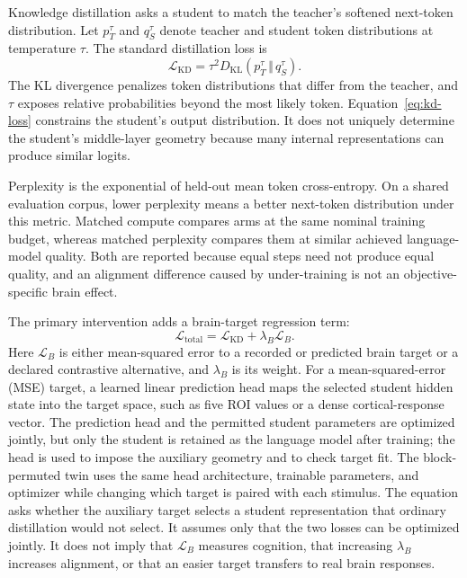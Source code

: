 Knowledge distillation asks a student to match the teacher's softened next-token distribution.
Let $p_T^{\tau}$ and $q_S^{\tau}$ denote teacher and student token distributions at temperature $\tau$.
The standard distillation loss is
\begin{equation}
  \mathcal{L}_{\mathrm{KD}}=\tau^2 D_{\mathrm{KL}}\!\left(p_T^{\tau}\,\Vert\,q_S^{\tau}\right).
  \label{eq:kd-loss}
\end{equation}
The KL divergence penalizes token distributions that differ from the teacher, and $\tau$ exposes relative probabilities beyond the most likely token.
Equation~\ref{eq:kd-loss} constrains the student's output distribution.
It does not uniquely determine the student's middle-layer geometry because many internal representations can produce similar logits.

Perplexity is the exponential of held-out mean token cross-entropy.
On a shared evaluation corpus, lower perplexity means a better next-token distribution under this metric.
Matched compute compares arms at the same nominal training budget, whereas matched perplexity compares them at similar achieved language-model quality.
Both are reported because equal steps need not produce equal quality, and an alignment difference caused by under-training is not an objective-specific brain effect.

The primary intervention adds a brain-target regression term:
\begin{equation}
  \mathcal{L}_{\mathrm{total}}=\mathcal{L}_{\mathrm{KD}}+\lambda_{B}\mathcal{L}_{B} .
  \label{eq:brain-objective}
\end{equation}
Here $\mathcal{L}_{B}$ is either mean-squared error to a recorded or predicted brain target or a declared contrastive alternative, and $\lambda_B$ is its weight.
For a mean-squared-error (MSE) target, a learned linear prediction head maps the selected student hidden state into the target space, such as five ROI values or a dense cortical-response vector.
The prediction head and the permitted student parameters are optimized jointly, but only the student is retained as the language model after training; the head is used to impose the auxiliary geometry and to check target fit.
The block-permuted twin uses the same head architecture, trainable parameters, and optimizer while changing which target is paired with each stimulus.
The equation asks whether the auxiliary target selects a student representation that ordinary distillation would not select.
It assumes only that the two losses can be optimized jointly.
It does not imply that $\mathcal{L}_{B}$ measures cognition, that increasing $\lambda_B$ increases alignment, or that an easier target transfers to real brain responses.

